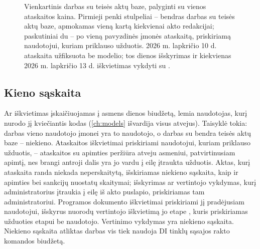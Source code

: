 \begin{figure}[H]
\centering
{}
\caption{Vienkartinis darbas su teisės aktų baze, palyginti su vienos ataskaitos kaina.
Pirmieji penki stulpeliai -- bendras darbas su teisės aktų baze, apmokamas vieną kartą
kiekvienai akto redakcijai; paskutiniai du -- po vieną pavyzdinės įmonės ataskaitą,
priskiriamą naudotojui, kuriam priklauso užduotis. 2026 m. lapkričio 10 d. ataskaita
užfiksuota be modelio; tos dienos išskyrimas ir kiekvienas 2026 m. lapkričio 13 d.
iškvietimas vykdyti su .}\label{fig:control:split}
\end{figure}

\subsection{Kieno sąskaita}

Ar iškvietimas įskaičiuojamas į asmens dienos biudžetą, lemia naudotojas, kurį nurodo jį
kviečiantis kodas (\cref{ch:models} išvardija visus atvejus). Taisyklė tokia: darbas vieno
naudotojo įmonei yra to naudotojo, o darbas su bendra teisės aktų baze -- niekieno.
Ataskaitos iškvietimai priskiriami naudotojui, kuriam priklauso užduotis, -- ataskaitos su
apimties peržiūra atveju asmeniui, patvirtinusiam apimtį, nes brangi antroji dalis yra jo
vardu į eilę įtraukta užduotis. Aktas, kurį ataskaita randa niekada neperskaitytą,
išskiriamas niekieno sąskaita, kaip ir apimties bei sankcijų nuostatų skaitymai; išskyrimas
ar vertintojo vykdymas, kurį administratorius įtraukia į eilę iš akto puslapio, priskiriamas tam
administratoriui. Programos dokumento iškvietimai priskiriami jį pradėjusiam naudotojui,
išskyrus nuorodų vertintojo iškvietimą jo etape , kuris priskiriamas
užduoties etapui be naudotojo. Vertinimo vykdymas yra niekieno sąskaita. Niekieno sąskaita
atliktas darbas vis tiek naudoja DI tinklų sąsajos rakto komandos biudžetą.

